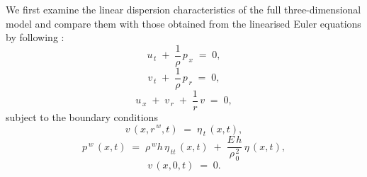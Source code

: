 \documentclass[alpha-refs, 12pt]{wiley-article}
\begin{document}
We first examine the linear dispersion characteristics of the full three-dimensional model and compare them with those obtained from the linearised Euler equations by following \citep{Mitsotakis2018}:
\begin{equation}\label{eq:lin_u}
  u_{\,t}\;+\;\frac{1}{\rho}\,p_{\,x}\;=\;0,
\end{equation}
\begin{equation}\label{eq:lin_v}
  v_{\,t}\;+\;\frac{1}{\rho}\,p_{\,r}\;=\;0,
\end{equation}
\begin{equation}\label{eq:lin_cont}
  u_{\,x}\;+\;v_{\,r}\;+\;\frac{1}{r}\,v\;=\;0,
\end{equation}
subject to the boundary conditions
\begin{equation}\label{eq:lin_bc_kin}
  v\,\left(x,r^{\,w},t\right)\;=\;\eta_{\,t}\,\left(x,t\right),
\end{equation}
\begin{equation}\label{eq:lin_bc_dyn}
  p^{\,w}\,\left(x,t\right)\; = \;\rho^{\,w}h\,\eta_{\,tt}\,\left(x,t\right)\; + \;\frac{E\,h}{\rho_{\,0}^{\,2}}\,
  \eta\,\left(x,t\right),
\end{equation}
\begin{equation}\label{eq:lin_bc_axis}
  v\,\left(x,0,t\right)\; = \;0.
\end{equation}
\end{document}
